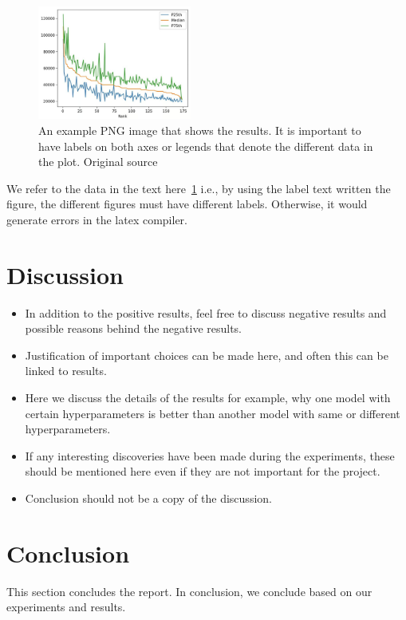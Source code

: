 \documentclass[conference]{IEEEtran}
\begin{document}
\begin{figure}[h]
    \centering
    \includegraphics[width=0.45\textwidth]{figures/example_data_plot.png}
    \caption{An example PNG image that shows the results. It is important to have labels on both axes or legends that denote the different data in the plot. Original source~\cite{data_plot_example}}
    \label{fig:example_data}
\end{figure}

We refer to the data in the text here~\ref{fig:example_data} i.e., by using the label text written the figure, the different figures must have different labels. Otherwise, it would generate errors in the latex compiler.

\section{Discussion}


\begin{itemize}
    \item In addition to the positive results, feel free to discuss negative results and possible reasons behind the negative results.
    \item Justification of important choices can be made here, and often this can be linked to results. 
    \item Here we discuss the details of the results for example, why one model with certain hyperparameters is better than another model with same or different hyperparameters.
    \item If any interesting discoveries have been made during the experiments, these should be mentioned here even if they are not important for the project.
    \item Conclusion should not be a copy of the discussion.
\end{itemize}
\section{Conclusion}
This section concludes the report. 
In conclusion, we conclude based on our experiments and results.


\color{black}


\end{document}
